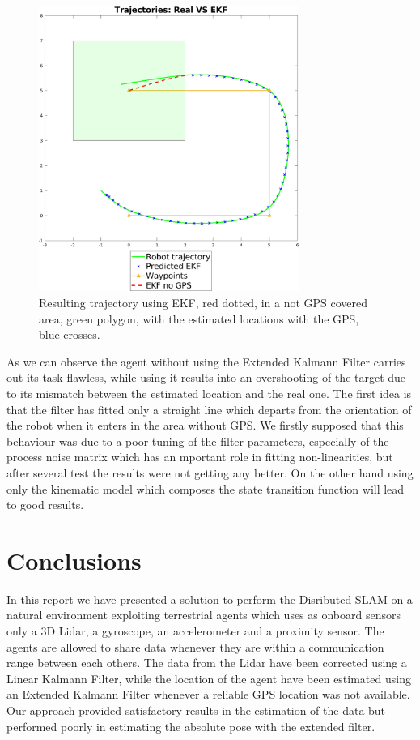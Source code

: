 \documentclass[twocolumn, a4paper]{article}
\begin{document}
\begin{figure}[h!]
    \centering
    \includegraphics[width=8.5cm]{"../Report_images/Trajectory_EKF.png"}
    \caption{Resulting trajectory using EKF, red dotted, in a not GPS covered
             area, green polygon, with the estimated locations with the GPS,
             blue crosses.}
    \label{fig:EKF_on}
\end{figure}
\vspace{0.3cm}
As we can observe the agent without using the Extended Kalmann Filter carries
out its task flawless, while using it results into an overshooting of the
target due to its mismatch between the estimated location and the real one.
The first idea is that the filter has fitted only a straight line which
departs from the orientation of the robot when it enters in the area without
GPS. We firstly supposed that this behaviour was due to a poor tuning of the
filter parameters, especially of the process noise matrix which has an 
mportant role in fitting non-linearities, but after several test the
results were not getting any better. On the other hand using only the
kinematic model which composes the state transition function will lead
to good results.

\section{Conclusions}
In this report we have presented a solution to perform the Disributed SLAM
on a natural environment exploiting terrestrial agents which uses as onboard
sensors only a 3D Lidar, a gyroscope, an accelerometer and a proximity sensor.
The agents are allowed to share data whenever they are within a communication
range between each others.
The data from the Lidar have been corrected using a Linear Kalmann Filter,
while the location of the agent have been estimated using an Extended
Kalmann Filter whenever a reliable GPS location was not available.
Our approach provided satisfactory results in the estimation of the 
data but performed poorly in estimating the absolute pose with the extended
filter.
\end{document}
